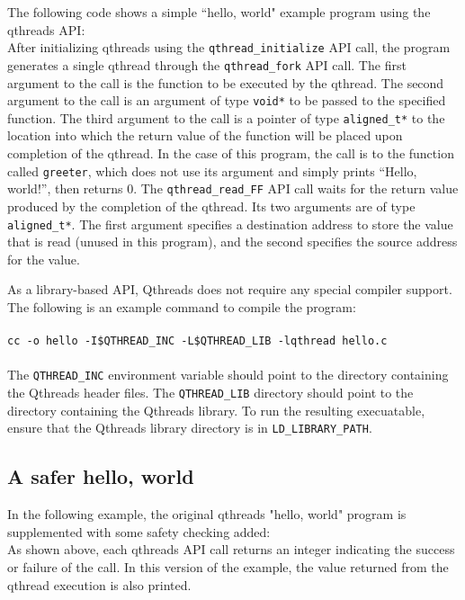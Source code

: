 \documentclass[12pt]{article}
\begin{document}
The following code shows a simple ``hello, world" example program using the qthreads API:
\\


After initializing qthreads using the {\tt qthread\_initialize} API call, the program generates a single qthread through the {\tt qthread\_fork} API call.  The first argument to the call is the function to be executed by the qthread.  The second argument to the call is an argument of type {\tt void*} to be passed to the specified function.  The third argument to the call is a pointer of type {\tt aligned\_t*} to the location into which the return value of the function will be placed upon completion of the qthread.  In the case of this program, the call is to the function called {\tt greeter}, which does not use its argument and simply prints ``Hello, world!'', then returns 0.  The {\tt qthread\_read\_FF} API call waits for the return value produced by the completion of the qthread.  Its two arguments are of type {\tt aligned\_t*}.  The first argument specifies a destination address to store the value that is read (unused in this program), and the second specifies the source address for the value.

As a library-based API, Qthreads does not require any special compiler support.  The following is an example command to compile the program:
\\ \\
{\footnotesize{\tt cc -o hello -I\$QTHREAD\_INC -L\$QTHREAD\_LIB -lqthread hello.c}}
\\ \\
The {\tt QTHREAD\_INC} environment variable should point to the directory containing the Qthreads header files.  The {\tt QTHREAD\_LIB} directory should point to the directory containing the Qthreads library.  To run the resulting execuatable, ensure that the Qthreads library directory is in {\tt LD\_LIBRARY\_PATH}.

\subsection{A safer hello, world}

In the following example, the original qthreads "hello, world" program is supplemented with some safety checking added:
\\


As shown above, each qthreads API call returns an integer indicating the success or failure of the call. In this version of the example, the value returned from the qthread execution is also printed.
\end{document}
